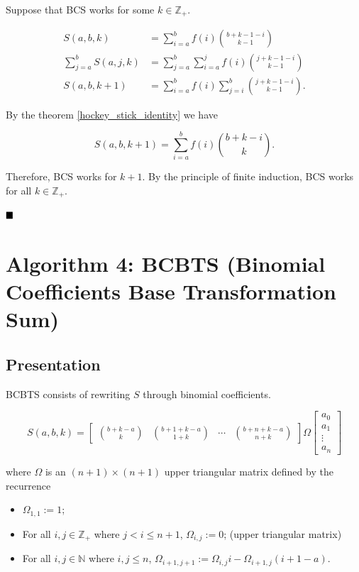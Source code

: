 \documentclass[12pt]{article}
\begin{document}
Suppose that BCS works for some $k \in \mathbb{Z}_{+}$.

\begin{align*}
    S(a, b, k) & = \sum_{i = a}^{b} f(i) \binom{b + k - 1 - i}{k - 1} \\
    \sum_{j=a}^{b} S(a, j, k) & = \sum_{j=a}^{b} \sum_{i = a}^{j} f(i) \binom{j + k - 1 - i}{k - 1} \\
    S(a, b, k + 1) & = \sum_{i=a}^{b} f(i) \sum_{j = i}^{b} \binom{j + k - 1 - i}{k - 1}.
\end{align*}

By the theorem \ref{hockey_stick_identity} we have

$$
    \boxed{S(a, b, k + 1) = \sum_{i=a}^{b} f(i) \binom{b + k - i}{k}}.
$$

Therefore, BCS works for $k + 1$. By the principle of finite induction, BCS works for all $k \in \mathbb{Z}_{+}$.

$\hfill\blacksquare$

\section{Algorithm 4: BCBTS (Binomial Coefficients Base Transformation Sum)}

\subsection{Presentation}

BCBTS consists of rewriting $S$ through binomial coefficients.

$$
    S(a, b, k) = \begin{bmatrix}
        \binom{b+k-a}{k} & \binom{b+1+k-a}{1+k} & \cdots & \binom{b+n+k-a}{n+k}
    \end{bmatrix} \Omega
    \begin{bmatrix}
        a_0 \\ a_1 \\ \vdots \\ a_n
    \end{bmatrix}
$$

where $\Omega$ is an $(n+1) \times (n+1)$ upper triangular matrix defined by the recurrence


\begin{itemize}
    \item $\Omega_{1, 1} := 1$;
    \item For all $i, j \in \mathbb{Z_+}$ where  $j < i \leq n+1$, $\Omega_{i, j} := 0$; \hfill (upper triangular matrix)
    \item For all $i, j \in \mathbb{N}$ where $i, j \leq n$, $\Omega_{i+1, j+1} :=  \Omega_{i, j} i - \Omega_{i+1, j} (i+1-a)$.
\end{itemize}
\end{document}
